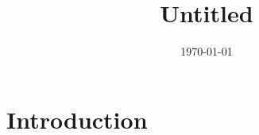\documentclass[11pt, a4paper]{article}
\title{Untitled}
\author{}
\date{\today}
\begin{document}
\maketitle

\section{Introduction}
\end{document}
